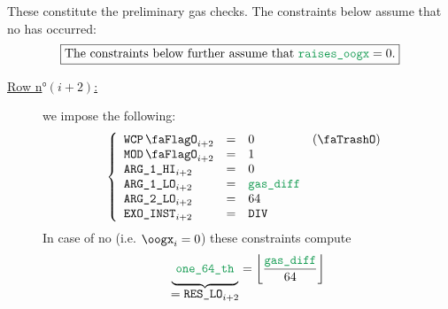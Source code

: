 These constitute the preliminary gas checks. The constraints below assume that no \oogxSH{} has occurred:
\[
	\boxed{\text{The constraints below further assume that } \locOogx = 0.}
\]
\begin{description}
	\item[\underline{Row n$°(i + 2)$:}] we impose the following:
		\[
			\left\{\begin{array}{lclr}
				\wcpLookupFlag_{i + 2} & = & 0 & (\trash) \\
				\divLookupFlag_{i + 2} & = & 1 \\
				\argOneHi_{i + 2}      & = & 0 \\
				\argOneLo_{i + 2}      & = & \locDiff  \\
				\argTwoLo_{i + 2}      & = & 64 \\
				\exoInst_{i + 2}       & = & \inst{DIV} \\
			\end{array}\right.
		\]
		In case of no \oogxSH{} (i.e. $\oogx_{i} = 0$) these constraints compute
		\[
			\underbrace{\phantom{\Big|}\locOneSixtyFourth\phantom{\Big|}}_{\displaystyle = \resLo_{i + 2}}
			=
			\left\lfloor\frac{\locDiff}{64}\right\rfloor
		\]
\end{description}
